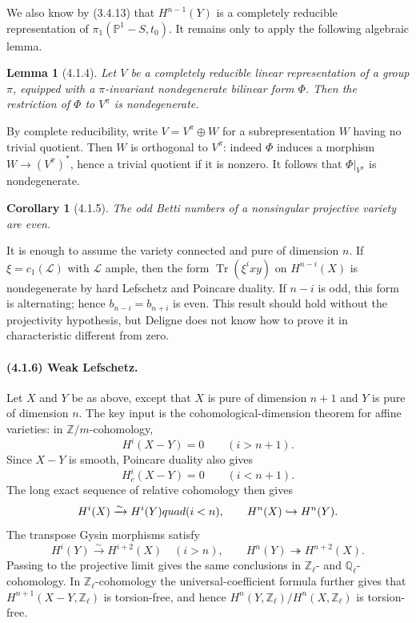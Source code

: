 \documentclass[11pt]{article}
\newtheorem{lemma}{Lemma}
\newtheorem{corollary}{Corollary}
\theoremstyle{remark}
\begin{document}
We also know by (3.4.13) that $H^{n-1}(Y)$ is a completely reducible representation of $\pi_1(\mathbb P^1-S,t_0)$. It remains only to apply the following algebraic lemma.

\begin{lemma}[4.1.4]
Let $V$ be a completely reducible linear representation of a group $\pi$, equipped with a $\pi$-invariant nondegenerate bilinear form $\Phi$. Then the restriction of $\Phi$ to $V^\pi$ is nondegenerate.
\end{lemma}

By complete reducibility, write $V=V^\pi\oplus W$ for a subrepresentation $W$ having no trivial quotient. Then $W$ is orthogonal to $V^\pi$: indeed $\Phi$ induces a morphism $W\to (V^\pi)^*$, hence a trivial quotient if it is nonzero. It follows that $\Phi|_{V^\pi}$ is nondegenerate.

\begin{corollary}[4.1.5]
The odd Betti numbers of a nonsingular projective variety are even.
\end{corollary}

It is enough to assume the variety connected and pure of dimension $n$. If $\xi=c_1(\mathcal L)$ with $\mathcal L$ ample, then the form $\operatorname{Tr}(\xi^i xy)$ on $H^{n-i}(X)$ is nondegenerate by hard Lefschetz and Poincare duality. If $n-i$ is odd, this form is alternating; hence $b_{n-i}=b_{n+i}$ is even. This result should hold without the projectivity hypothesis, but Deligne does not know how to prove it in characteristic different from zero.

\paragraph{(4.1.6) Weak Lefschetz.}
Let $X$ and $Y$ be as above, except that $X$ is pure of dimension $n+1$ and $Y$ is pure of dimension $n$. The key input is the cohomological-dimension theorem for affine varieties: in $\mathbb Z/m$-cohomology,
\[
H^i(X-Y)=0\qquad (i>n+1).
\]
Since $X-Y$ is smooth, Poincare duality also gives
\[
H_c^i(X-Y)=0\qquad (i<n+1).
\]
The long exact sequence of relative cohomology then gives
\[
H^i(X)\xrightarrow{\sim}H^i(Y)\\quad (i<n),
\qquad
H^n(X)\hookrightarrow H^n(Y).
\]
The transpose Gysin morphisms satisfy
\[
H^i(Y)\xrightarrow{\sim}H^{i+2}(X)\quad (i>n),
\qquad
H^n(Y)\twoheadrightarrow H^{n+2}(X).
\]
Passing to the projective limit gives the same conclusions in $\mathbb Z_\ell$- and $\mathbb Q_\ell$-cohomology. In $\mathbb Z_\ell$-cohomology the universal-coefficient formula further gives that $H^{n+1}(X-Y,\mathbb Z_\ell)$ is torsion-free, and hence $H^n(Y,\mathbb Z_\ell)/H^n(X,\mathbb Z_\ell)$ is torsion-free.
\end{document}
